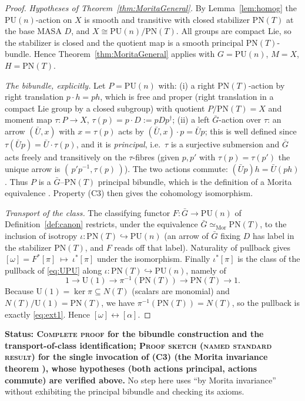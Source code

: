 \documentclass[11pt]{article}
\theoremstyle{definition}
\newcommand{\U}{\mathrm{U}}
\newcommand{\PU}{\mathrm{PU}}
\newcommand{\PN}{\mathrm{PN}}
\newcommand{\Nt}{N(T)}
\newcommand{\STAT}[1]{\noindent\textbf{Status: #1}}
\newcommand{\COMPLETE}{\textsc{Complete proof}}
\newcommand{\SKETCH}{\textsc{Proof sketch (named standard result)}}
\begin{document}
\begin{proof}
\emph{Hypotheses of Theorem~\ref{thm:MoritaGeneral}.} By Lemma~\ref{lem:homog} the
$\PU(n)$-action on $X$ is smooth and transitive with closed stabilizer $\PN(T)$ at the base
MASA $D$, and $X\cong\PU(n)/\PN(T)$. All groups are compact Lie, so the stabilizer is
closed and the quotient map is a smooth principal $\PN(T)$-bundle. Hence
Theorem~\ref{thm:MoritaGeneral} applies with $G=\PU(n)$, $M=X$, $H=\PN(T)$.

\emph{The bibundle, explicitly.} Let $P=\PU(n)$ with:
(i) a right $\PN(T)$-action by right translation $p\cdot h=ph$, which is free and proper
(right translation in a compact Lie group by a closed subgroup) with quotient
$P/\PN(T)=X$ and moment map $\tau\colon P\to X$, $\tau(p)=p\cdot D:=pDp^{\dagger}$;
(ii) a left $\bar G$-action over $\tau$: an arrow $(\bar U,x)$ with $x=\tau(p)$ acts by
$(\bar U,x)\cdot p=\bar U p$; this is well defined since $\tau(\bar U p)=\bar U\cdot\tau(p)$,
and it is \emph{principal}, i.e.\ $\tau$ is a surjective submersion and $\bar G$ acts freely
and transitively on the $\tau$-fibres (given $p,p'$ with $\tau(p)=\tau(p')$ the unique arrow
is $(\,p'p^{-1},\tau(p)\,)$). The two actions commute:
$(\bar U p)h=\bar U(ph)$. Thus $P$ is a $\bar G$--$\PN(T)$ principal bibundle, which is the
definition of a Morita equivalence \cite[\S5.4]{MoerdijkMrcun}. Property (C3) then gives the
cohomology isomorphism.

\emph{Transport of the class.} The classifying functor $F\colon\bar G\to\PU(n)$ of
Definition~\ref{def:canon} restricts, under the equivalence
$\bar G\simeq_{\mathrm{Mor}}\PN(T)$, to the inclusion of isotropy
$\iota\colon\PN(T)\hookrightarrow\PU(n)$ (an arrow of $\bar G$ fixing $D$ has label in the
stabilizer $\PN(T)$, and $F$ reads off that label). Naturality of pullback gives
$[\omega]=F^{*}[\pi]\ \mapsto\ \iota^{*}[\pi]$ under the isomorphism. Finally $\iota^{*}[\pi]$
is the class of the pullback of \eqref{eq:UPU} along
$\iota\colon\PN(T)\hookrightarrow\PU(n)$, namely of
\[
1\to \U(1)\to \pi^{-1}(\PN(T))\to \PN(T)\to1 .
\]
Because $\U(1)=\ker\pi\subseteq \Nt$ (scalars are monomial) and $\Nt/\U(1)=\PN(T)$, we have
$\pi^{-1}(\PN(T))=\Nt$, so the pullback is exactly \eqref{eq:ext1}. Hence
$[\omega]\leftrightarrow[\alpha]$.
\end{proof}
\STAT{\COMPLETE{} for the bibundle construction and the transport-of-class identification;
\SKETCH{} for the single invocation of (C3) (the Morita invariance theorem
\cite{BehrendXu,TXL,Crainic}), whose hypotheses (both actions principal, actions commute)
are verified above.} No step here uses ``by Morita invariance'' without exhibiting the
principal bibundle and checking its axioms.
\end{document}

